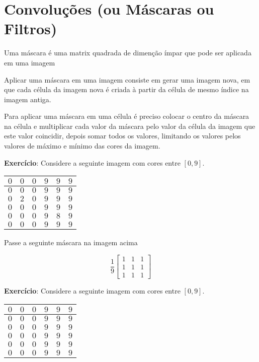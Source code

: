 \documentclass[12pt]{article}
\begin{document}
\break





\section{Convoluções (ou Máscaras ou Filtros)}

Uma máscara é uma matrix quadrada de dimenção ímpar que pode ser aplicada em uma imagem

Aplicar uma máscara em uma imagem consiste em gerar uma imagem nova, em que cada célula da imagem nova é criada à partir da célula de mesmo índice na imagem antiga.

Para aplicar uma máscara em uma célula é preciso colocar o centro da máscara na célula e multiplicar cada valor da máscara pelo valor da célula da imagem que este valor coincidir, depois somar todos os valores, limitando os valores pelos valores de máximo e mínimo das cores da imagem.

\textbf{Exercício}: Considere a seguinte imagem com cores entre $[0, 9]$.

\begin{tabular}{|c|c|c|c|c|c|}
\hline
$0$ & $0$ & $0$ & $9$ & $9$ & $9$ \\ \hline
$0$ & $0$ & $0$ & $9$ & $9$ & $9$ \\ \hline
$0$ & $2$ & $0$ & $9$ & $9$ & $9$ \\ \hline
$0$ & $0$ & $0$ & $9$ & $9$ & $9$ \\ \hline
$0$ & $0$ & $0$ & $9$ & $8$ & $9$ \\ \hline
$0$ & $0$ & $0$ & $9$ & $9$ & $9$ \\ \hline

\end{tabular}

Passe a seguinte máscara na imagem acima

\[
\frac{1}{9}
\begin{bmatrix}
1 & 1 & 1\\
1 & 1 & 1\\
1 & 1 & 1
\end{bmatrix}
\]

\break

\textbf{Exercício}: Considere a seguinte imagem com cores entre $[0, 9]$.

\begin{tabular}{|c|c|c|c|c|c|}
\hline
$0$ & $0$ & $0$ & $9$ & $9$ & $9$ \\ \hline
$0$ & $0$ & $0$ & $9$ & $9$ & $9$ \\ \hline
$0$ & $0$ & $0$ & $9$ & $9$ & $9$ \\ \hline
$0$ & $0$ & $0$ & $9$ & $9$ & $9$ \\ \hline
$0$ & $0$ & $0$ & $9$ & $9$ & $9$ \\ \hline
$0$ & $0$ & $0$ & $9$ & $9$ & $9$ \\ \hline

\end{tabular}
\end{document}

